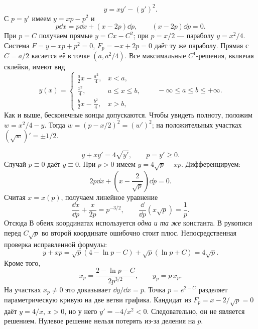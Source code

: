 \[
 y=xy'-(y')^2.
\]
С $p=y'$ имеем $y=xp-p^2$ и
\[
 p\dd x=p\dd x+(x-2p)\dd p,
 \qquad (x-2p)\dd p=0.
\]
При $p=C$ получаем прямые $y=Cx-C^2$; при $p=x/2$ --- параболу $y=x^2/4$.
Система $F=y-xp+p^2=0$, $F_p=-x+2p=0$ даёт ту же параболу.
Прямая с $C=a/2$ касается её в точке $(a,a^2/4)$.
Все максимальные $C^1$-решения, включая склейки, имеют вид
\[
 y(x)=\begin{cases}
 \frac a2x-\frac{a^2}4,&x<a,\\
 \frac{x^2}4,&a\le x\le b,\\
 \frac b2x-\frac{b^2}4,&x>b,
 \end{cases}\qquad -\infty\le a\le b\le+\infty.
\]
Как и выше, бесконечные концы допускаются. Чтобы увидеть полноту,
положим $w=x^2/4-y$. Тогда $w=(p-x/2)^2=(w')^2$;
на положительных участках $(\sqrt w)'=\pm1/2$.
\begin{center}
\end{center}

\[
 y+xy'=4\sqrt{y'},\qquad p=y'\ge0.
\]
Случай $p\equiv0$ даёт $y\equiv0$. При $p>0$ имеем
$y=4\sqrt p-xp$. Дифференцируем:
\[
 2p\dd x+\left(x-\frac2{\sqrt p}\right)\dd p=0.
\]
Считая $x=x(p)$, получаем линейное уравнение
\[
 \frac{\dd x}{\dd p}+\frac{x}{2p}=p^{-3/2},\qquad
 \frac{\dd}{\dd p}(x\sqrt p)=\frac1p.
\]
Отсюда
В обеих координатах используется \emph{одна и та же} константа.
В рукописи перед $C\sqrt p$ во второй координате ошибочно стоит плюс.
Непосредственная проверка исправленной формулы:
\[
 y+xp=\sqrt p(4-\ln p-C)+\sqrt p(\ln p+C)=4\sqrt p.
\]
Кроме того,
\[
 x_p=\frac{2-\ln p-C}{2p^{3/2}},\qquad y_p=p\,x_p.
\]
На участках $x_p\ne0$ это доказывает $\dd y/\dd x=p$.
Точка $p=e^{2-C}$ разделяет параметрическую кривую на две ветви графика.
Кандидат из $F_p=x-2/\sqrt p=0$ даёт $y=4/x$, $x>0$,
но у него $y'=-4/x^2<0$. Следовательно, он не является решением.
Нулевое решение нельзя потерять из-за деления на $p$.


